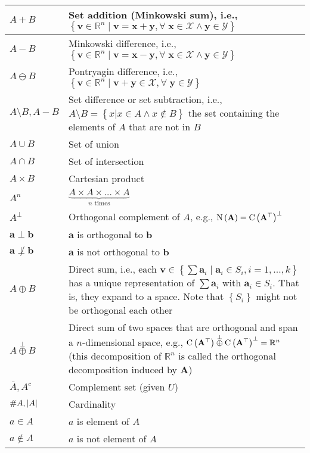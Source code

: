 \documentclass{article}
\begin{document}
\begin{xltabular}{\textwidth}{XX}
    \(A + B\) & Set addition (Minkowski sum), i.e., \(\left\{ \mathbf{v} \in \mathbb{R}^{n} \mid \mathbf{v} = \mathbf{x}+\mathbf{y}, \forall \; \mathbf{x} \in \mathcal{X} \wedge \mathbf{y} \in \mathcal{Y} \right\}\) \cite{kouvaritakisModelPredictiveControl2016}\\ \hline
    \(A - B\) &  Minkowski difference, i.e., \(\left\{ \mathbf{v} \in \mathbb{R}^{n} \mid \mathbf{v} = \mathbf{x}-\mathbf{y}, \forall \; \mathbf{x} \in \mathcal{X} \wedge \mathbf{y} \in \mathcal{Y} \right\}\)\\ \hline
    \(A \ominus B\) & Pontryagin difference, i.e., \(\left\{ \mathbf{v} \in \mathbb{R}^{n} \mid \mathbf{v} + \mathbf{y} \in \mathcal{X} , \forall \; \mathbf{y} \in \mathcal{Y} \right\}\) \cite{kouvaritakisModelPredictiveControl2016}\\ \hline
    \(A \setminus B, A-B\) & Set difference or set subtraction, i.e., \(A \setminus B = \left\{ x \vert x \in A \wedge x \not\in B \right\}\) the set containing the elements of \(A\) that are not in \(B\) \cite{rosenDiscreteMathematicsIts2011}\\ \hline
    \(A \cup B\) & Set of union\\ \hline
    \(A \cap B\) & Set of intersection\\ \hline
    \(A \times B\) & Cartesian product\\ \hline
    \(A^n\) & \(\underbrace{A \times A \times \dots \times A}_{n \text{ times}}\)\\ \hline
    \(A^{\perp}\) & Orthogonal complement of \(A\), e.g., \(\operatorname{N}\left(\mathbf{A}\right) = \operatorname{C}\left(\mathbf{A}^{\top}\right)^{\perp}\) \cite{boydConvexOptimization2004}\\ \hline
    \(\mathbf{a} \perp \mathbf{b}\)   & \(\mathbf{a}\) is orthogonal to \(\mathbf{b}\)\\ \hline
    \(\mathbf{a} \not\perp \mathbf{b}\)            & \(\mathbf{a}\) is not orthogonal to \(\mathbf{b}\)\\
    \(A \oplus B\) & Direct sum, i.e., each \(\mathbf{v} \in \left\{ \sum \mathbf{a}_i \mid \mathbf{a}_i \in S_i, i=1,\dots,k \right\}\) has a unique representation of \(\sum \mathbf{a}_i\) with \(\mathbf{a}_i \in S_i\). That is, they expand to a space. Note that \(\left\{ S_i \right\}\) might not be orthogonal each other \cite{golubMatrixComputations2013}\\ \hline
    \(A \overset{\perp}{\oplus} B\) & Direct sum of two spaces that are orthogonal and span a \(n\)-dimensional space, e.g., \(\operatorname{C}\left(\mathbf{A}^{\top}\right) \overset{\perp}{\oplus} \operatorname{C}\left(\mathbf{A}^{\top}\right)^{\perp} = \mathbb{R}^{n}\) (this decomposition of \(\mathbb{R}^{n}\) is called the orthogonal decomposition induced by \(\mathbf{A}\)) \cite{boydConvexOptimization2004}\\ \hline
    \(\bar{A}, A^{c}\) & Complement set (given $U$)\\ \hline
    \(\#A, \abs{A}\) & Cardinality\\ \hline
    \(a \in A\)& \(a\) is element of \(A\) \\ \hline
    \(a \notin A\)& \(a\) is not element of \(A\) \\ \hline
\end{xltabular}
\end{document}

